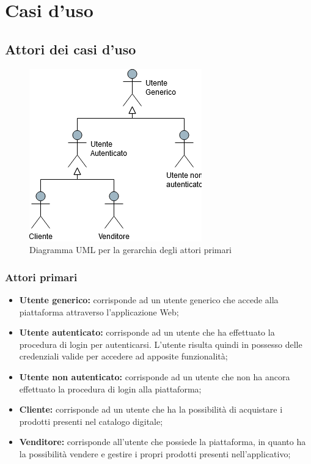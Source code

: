 \section{Casi d'uso}
\subsection{Attori dei casi d'uso}
\begin{figure}[H]
\centering
\includegraphics[scale=0.6]{res/UseCase/Immagini/DiagrammaAttoriPrimari}
\caption{Diagramma UML per la gerarchia degli attori primari}
\end{figure}
\subsubsection{Attori primari}
\begin{itemize}
\item \textbf{Utente generico:} corrisponde ad un utente generico che accede alla piattaforma attraverso l'applicazione Web;
\item \textbf{Utente autenticato:} corrisponde ad un utente che ha effettuato la procedura di login per autenticarsi. L'utente risulta quindi in possesso delle credenziali valide per accedere ad apposite funzionalità;
\item \textbf{Utente non autenticato:} corrisponde ad un utente che non ha ancora effettuato la procedura di login alla piattaforma;
\item \textbf{Cliente:} corrisponde ad un utente che ha la possibilità di acquistare i prodotti presenti nel catalogo digitale;
\item \textbf{Venditore:} corrisponde all'utente che possiede la piattaforma, in quanto ha la possibilità vendere e gestire i propri prodotti presenti nell'applicativo;
\end{itemize}
